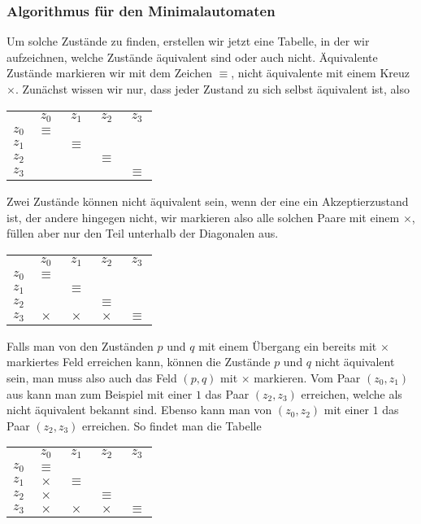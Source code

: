 \subsubsection{Algorithmus für den Minimalautomaten
\label{algorithmus:minimalautomat}}
Um solche Zustände zu finden, erstellen wir jetzt eine Tabelle, in der
wir aufzeichnen, welche Zustände äquivalent sind oder auch nicht.
Äquivalente Zustände markieren wir mit dem Zeichen $\equiv$, nicht
äquivalente mit einem Kreuz $\times$.
Zunächst wissen wir nur, dass jeder Zustand zu sich selbst äquivalent
ist, also
\begin{center}
\begin{tabular}{ccccc}
     &$z_0$   &$z_1$   &$z_2$   &$z_3$   \\
$z_0$&$\equiv$&        &        &        \\
$z_1$&        &$\equiv$&        &        \\
$z_2$&        &        &$\equiv$&        \\
$z_3$&        &        &        &$\equiv$
\end{tabular}
\end{center}
Zwei Zustände können nicht äquivalent sein, wenn der eine
ein Akzeptierzustand ist, der andere hingegen nicht, wir markieren
also alle solchen Paare mit einem $\times$, füllen aber nur den Teil unterhalb der
Diagonalen aus.
\begin{center}
\begin{tabular}{ccccc}
     &$z_0$   &$z_1$   &$z_2$   &$z_3$   \\
$z_0$&$\equiv$&        &        &        \\
$z_1$&        &$\equiv$&        &        \\
$z_2$&        &        &$\equiv$&        \\
$z_3$&$\times$&$\times$&$\times$&$\equiv$
\end{tabular}
\end{center}
Falls man von den Zuständen $p$ und $q$ mit einem Übergang
ein bereits mit $\times$ markiertes Feld erreichen kann, können die
Zustände $p$ und $q$ nicht äquivalent sein, man muss also auch das
Feld $(p,q)$ mit $\times$ markieren.
Vom Paar $(z_0,z_1)$ aus kann man zum Beispiel mit einer $1$ das
Paar $(z_2,z_3)$ erreichen, welche als nicht äquivalent bekannt
sind.
Ebenso kann man von $(z_0,z_2)$ mit einer $1$ das Paar
$(z_2,z_3)$ erreichen.
So findet man die Tabelle
\begin{center}
\begin{tabular}{ccccc}
     &$z_0$   &$z_1$   &$z_2$   &$z_3$   \\
$z_0$&$\equiv$&        &        &        \\
$z_1$&$\times$&$\equiv$&        &        \\
$z_2$&$\times$&        &$\equiv$&        \\
$z_3$&$\times$&$\times$&$\times$&$\equiv$
\end{tabular}
\end{center}
